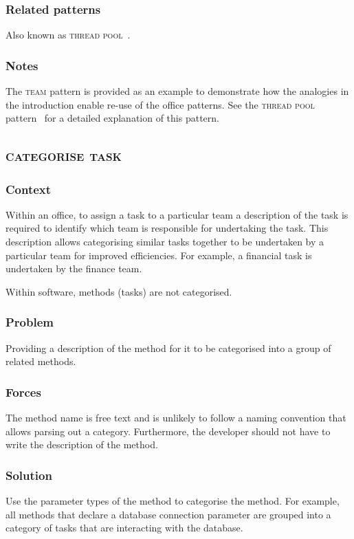 \documentclass[prodmode]{style/acmlarge}
\begin{document}
\subsubsection*{Related patterns} Also known as \textsc{thread pool}~\cite{thread-per-request}.

\subsubsection*{Notes} The \textsc{team} pattern is provided as an example to
demonstrate how the analogies in the introduction enable re-use of the office
patterns. See the \textsc{thread pool} pattern~\cite{thread-per-request} for a
detailed explanation of this pattern.



\subsection{\textsc{\textbf{categorise task}}}

\subsubsection*{Context} Within an office, to assign a task to a particular team
a description of the task is required to identify which team is responsible for
undertaking the task.  This description allows categorising similar tasks
together to be undertaken by a particular team for improved efficiencies.  For
example, a financial task is undertaken by the finance team.

Within software, methods (tasks) are not categorised.

\subsubsection*{\textbf{Problem}} Providing a description of the method for it to be
categorised into a group of related methods.

\subsubsection*{Forces} The method name is free text and is unlikely to follow a
naming convention that allows parsing out a category.  Furthermore, the
developer should not have to write the description of the method.

\subsubsection*{\textbf{Solution}} Use the parameter types of the method to categorise
the method.  For example, all methods that declare a database connection
parameter are grouped into a category of tasks that are interacting with the
database.
\end{document}
